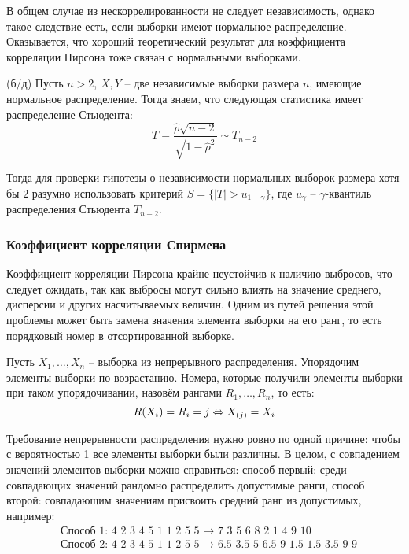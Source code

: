 \begin{note}
    В общем случае из нескоррелированности не следует независимость, однако такое следствие есть, если выборки имеют нормальное распределение. Оказывается, что хороший теоретический результат для коэффициента корреляции Пирсона тоже связан с нормальными выборками.
\end{note}

\begin{theorem} (б/д)
    Пусть $n > 2$, $X, Y$ -- две независимые выборки размера $n$, имеющие нормальное распределение. Тогда знаем, что следующая статистика имеет распределение Стьюдента:
    \[
        T = \frac{\hat{\rho} \sqrt{n-2}}{\sqrt{1 - \hat{\rho}^2}} \sim T_{n-2}
    \]
\end{theorem}

\begin{note}
    Тогда для проверки гипотезы о независимости нормальных выборок размера хотя бы $2$ разумно использовать критерий $S = \{|T| > u_{1-\gamma}\}$, где $u_\gamma$ -- $\gamma$-квантиль распределения Стьюдента $T_{n-2}$.
\end{note}

\subsubsection{Коэффициент корреляции Спирмена}

\begin{note}
    Коэффициент корреляции Пирсона крайне неустойчив к наличию выбросов, что следует ожидать, так как выбросы могут сильно влиять на значение среднего, дисперсии и других насчитываемых величин. Одним из путей решения этой проблемы может быть замена значения элемента выборки на его ранг, то есть порядковый номер в отсортированной выборке.
\end{note}

\begin{definition}
    Пусть $X_1, \dots, X_n$ -- выборка из непрерывного распределения. Упорядочим элементы выборки по возрастанию. Номера, которые получили элементы выборки при таком упорядочивании, назовём рангами $R_1, \dots, R_n$, то есть:
    \[
        R(X_i) = R_i = j \Leftrightarrow X_{(j)} = X_i
    \]
\end{definition}

\begin{note}
    Требование непрерывности распределения нужно ровно по одной причине: чтобы с вероятностью 1 все элементы выборки были различны. В целом, с совпадением значений элементов выборки можно справиться: способ первый: среди совпадающих значений рандомно распределить допустимые ранги, способ второй: совпадающим значениям присвоить средний ранг из допустимых, например:
    \begin{align*}
        & \text{Способ 1: 4 2 3 4 5 1 1 2 5 5 } \to \text{ 7 3 5 6 8 2 1 4 9 10}
        \\
        & \text{Способ 2: 4 2 3 4 5 1 1 2 5 5 } \to \text{ 6.5 3.5 5 6.5 9 1.5 1.5 3.5 9 9}
    \end{align*}
\end{note}

